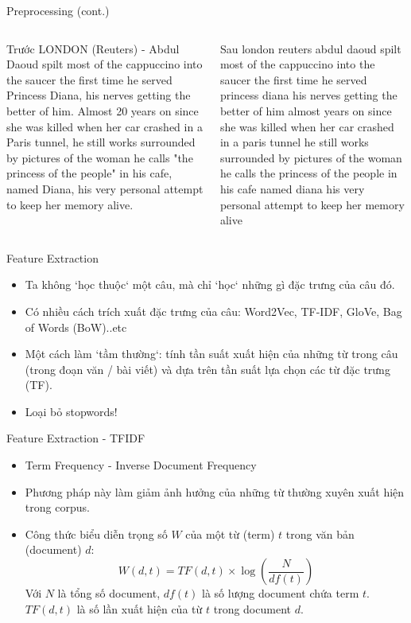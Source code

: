 \documentclass[aspectratio=169,xcolor=dvipsnames]{beamer}
\begin{document}
\begin{frame}{Preprocessing (cont.)}
\begin{columns}[c] %

\begin{block}{Trước}
LONDON (Reuters) - Abdul Daoud spilt most of the cappuccino into the saucer the first time he served Princess Diana, his nerves getting the better of him. Almost 20 years on since she was killed when her car crashed in a Paris tunnel, he still works surrounded by pictures of the woman he calls "the princess of the people" in his cafe, named Diana, his very personal attempt to keep her memory alive.
\end{block}
\pause
{} %
\begin{block}{Sau}
london  reuters    abdul daoud spilt most of the cappuccino into the saucer the first time he served princess diana  his nerves getting the better of him  almost  years on since she was killed when her car crashed in a paris tunnel  he still works surrounded by pictures of the woman he calls  the princess of the people  in his cafe  named diana  his very personal attempt to keep her memory alive 
\end{block}
\end{columns}
\end{frame}

\begin{frame}{Feature Extraction}
\begin{itemize}
\item Ta không `học thuộc` một câu, mà chỉ `học` những gì đặc trưng của câu đó.
\item Có nhiều cách trích xuất đặc trưng của câu: Word2Vec, TF-IDF, GloVe, Bag of Words (BoW)..etc
\item Một cách làm `tầm thường`: tính tần suất xuất hiện của những từ trong câu (trong đoạn văn / bài viết) và dựa trên tần suất lựa chọn các từ đặc trưng (TF).
\item Loại bỏ stopwords!
\end{itemize}
\end{frame}

\begin{frame}{Feature Extraction - TFIDF}
\begin{itemize}
\item Term Frequency - Inverse Document Frequency
\item Phương pháp này làm giảm ảnh hưởng của những từ thường xuyên xuất hiện trong corpus.
\item Công thức biểu diễn trọng số $W$ của một từ (term) $t$ trong văn bản (document) $d$:
$$
W(d, t) = TF(d, t) \times \log\left(\frac{N}{df(t)}\right)
$$
Với $N$ là tổng số document, $df(t)$ là số lượng document chứa term $t$. $TF(d, t)$ là số lần xuất hiện của từ $t$ trong document $d$.
\end{itemize}
\end{frame}
\end{document}
